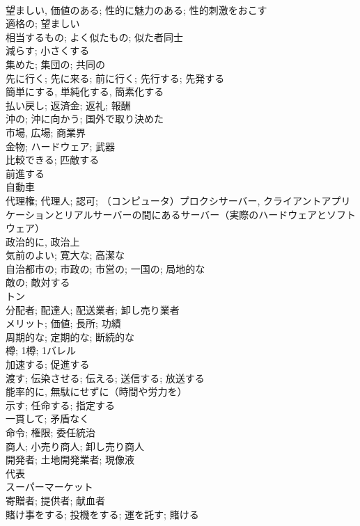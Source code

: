 \documentclass[8pt]{extreport}
\begin{document}
\begin{CJK}{UTF8}{min}
\\	望ましい, 価値のある; 性的に魅力のある; 性的刺激をおこす	
\\	適格の; 望ましい	
\\	相当するもの; よく似たもの; 似た者同士	
\\	減らす; 小さくする	
\\	集めた; 集団の; 共同の	
\\	先に行く; 先に来る; 前に行く; 先行する; 先発する	
\\	簡単にする, 単純化する, 簡素化する	
\\	払い戻し; 返済金; 返礼; 報酬	
\\	沖の; 沖に向かう; 国外で取り決めた	
\\	市場, 広場; 商業界	
\\	金物; ハードウェア; 武器	
\\	比較できる; 匹敵する	
\\	前進する	
\\	自動車	
\\	代理権; 代理人; 認可; （コンピュータ）プロクシサーバー, クライアントアプリケーションとリアルサーバーの間にあるサーバー（実際のハードウェアとソフトウェア）	
\\	政治的に, 政治上	
\\	気前のよい; 寛大な; 高潔な	
\\	自治都市の; 市政の; 市営の; 一国の; 局地的な	
\\	敵の; 敵対する	
\\	トン	
\\	分配者; 配達人; 配送業者; 卸し売り業者	
\\	メリット; 価値; 長所; 功績	
\\	周期的な; 定期的な; 断続的な
\\	樽; 1樽; 1バレル	
\\	加速する; 促進する	
\\	渡す; 伝染させる; 伝える; 送信する; 放送する	
\\	能率的に, 無駄にせずに（時間や労力を）	
\\	示す; 任命する; 指定する	
\\	一貫して; 矛盾なく	
\\	命令; 権限; 委任統治	
\\	商人; 小売り商人; 卸し売り商人	
\\	開発者; 土地開発業者; 現像液	
\\	代表	
\\	スーパーマーケット	
\\	寄贈者; 提供者; 献血者	
\\	賭け事をする; 投機をする; 運を託す; 賭ける	

\end{CJK}
\end{document}
